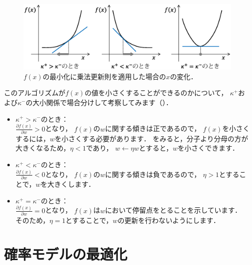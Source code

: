 \begin{figure}[t]
\centering
\includegraphics[width=.99\linewidth]{sections/optimization/multiplicative_update}
\caption{$f(x)$の最小化に乗法更新則を適用した場合の$x$の変化．}
\label{fig:multiplicative_update}
\end{figure}

このアルゴリズムが$f(x)$の値を小さくすることができるのかについて，
$\kappa^+$および$\kappa^-$の大小関係で場合分けして考察してみます（）．
\begin{itemize}
\item
$\kappa^+ > \kappa^-$のとき：\\
$\frac{\partial f(x)}{\partial w} > 0$となり，
$f(x)$の$w$に関する傾きは正であるので，
$f(x)$を小さくするには，$w$を小さくする必要があります．
をみると，分子より分母の方が大きくなるため，$\eta < 1$であり，
$w \gets \eta w$とすると，$w$を小さくできます．
\item
$\kappa^+ < \kappa^-$のとき：\\
$\frac{\partial f(x)}{\partial w} < 0$となり，
$f(x)$の$w$に関する傾きは負であるので，
$\eta > 1$とすることで，$w$を大きくします．
\item
$\kappa^+ = \kappa^-$のとき：\\
$\frac{\partial f(x)}{\partial w} = 0$となり，
$f(x)$は$w$において停留点をとることを示しています．
そのため，$\eta = 1$とすることで，$w$の更新を行わないようにします．
\end{itemize}

\section{確率モデルの最適化}

